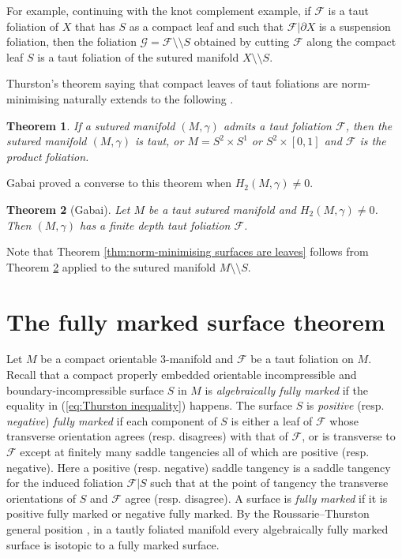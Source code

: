 \documentclass[11pt]{amsart}
\newtheorem{thm}{Theorem}[section]
\theoremstyle{remark}
\theoremstyle{definition}
\begin{document}
	For example, continuing with the knot complement example, if $\mathcal{F}$ is a taut foliation of $X$ that has $S$ as a compact leaf and such that $\mathcal{F}|\partial X$ is a suspension foliation, then the foliation $\mathcal{G} = \mathcal{F} \setminus \setminus S$ obtained by cutting $\mathcal{F}$ along the compact leaf $S$ is a taut foliation of the sutured manifold $ X \setminus \setminus S$. 

	Thurston's theorem saying that compact leaves of taut foliations are norm-minimising naturally extends to the following \cite{gabai1983foliations}. 
	
	\begin{thm}
		If a sutured manifold $(M , \gamma)$ admits a taut foliation $\mathcal{F}$, then the sutured manifold $(M, \gamma)$ is taut, or $M = S^2 \times S^1$ or $S^2 \times [0,1] $ and $\mathcal{F}$ is the product foliation. 
	\end{thm}
	
	Gabai \cite{gabai1983foliations} proved a converse to this theorem when $H_2(M , \gamma) \neq 0$.
	
	\begin{thm}[Gabai]
		Let $M$ be a taut sutured manifold and $H_2(M , \gamma) \neq 0$. Then $(M, \gamma)$ has a finite depth taut foliation $\mathcal{F}$. 
		\label{thm: taut sutured manifolds admit taut foliations}
	\end{thm}

	Note that Theorem \ref{thm:norm-minimising surfaces are leaves} follows from Theorem \ref{thm: taut sutured manifolds admit taut foliations} applied to the sutured manifold $M \setminus \setminus S$. 
	
	\section{The fully marked surface theorem}
	
	\label{sec: fully marked}
	
	Let $M$ be a compact orientable 3-manifold and $\mathcal{F}$ be a taut foliation on $M$.  Recall that a compact properly embedded orientable incompressible and boundary-incompressible surface $S$ in $M$ is  \emph{algebraically fully marked} if the equality in (\ref{eq:Thurston inequality}) happens. The surface $S$ is \emph{positive} (resp. \emph{negative}) \emph{fully marked} if each component of $S$ is either a leaf of $\mathcal{F}$ whose transverse orientation agrees (resp. disagrees) with that of $\mathcal{F}$, or is transverse to $\mathcal{F}$ except at finitely many saddle tangencies all of which are positive (resp. negative). Here a positive (resp. negative) saddle tangency is a saddle tangency for the induced foliation $\mathcal{F}|S$ such that at the point of tangency the transverse orientations of $S$ and $\mathcal{F}$ agree (resp. disagree). A surface is \emph{fully marked} if it is positive fully marked or negative fully marked. By the Roussarie--Thurston general position \cite{roussarie1974plongements, thurston1986norm}, in a tautly foliated manifold every algebraically fully marked surface is isotopic to a fully marked surface. 
	
\end{document}
